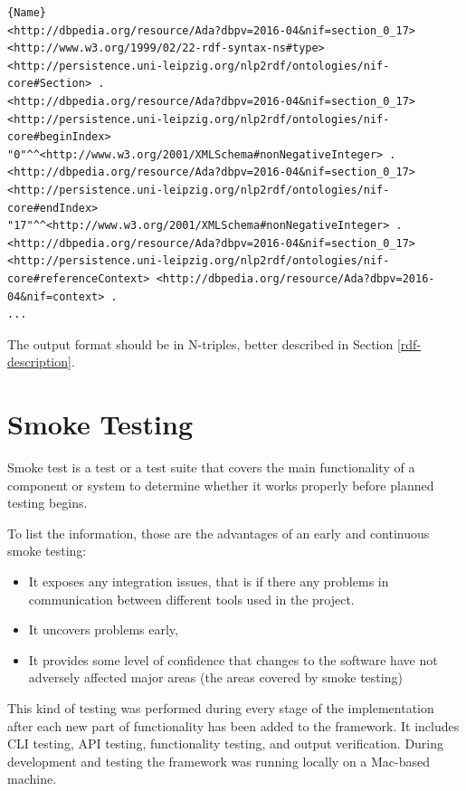 \documentclass[thesis=M,english,hidelinks]{FITthesis}[2019/12/23]
\begin{document}
\begin{lstlisting}[caption=Exemplary result for NIF Page Structure,frame=tlrb,  label = {lst:page-structure-example}]{Name}
<http://dbpedia.org/resource/Ada?dbpv=2016-04&nif=section_0_17> <http://www.w3.org/1999/02/22-rdf-syntax-ns#type> <http://persistence.uni-leipzig.org/nlp2rdf/ontologies/nif-core#Section> .
<http://dbpedia.org/resource/Ada?dbpv=2016-04&nif=section_0_17> <http://persistence.uni-leipzig.org/nlp2rdf/ontologies/nif-core#beginIndex> "0"^^<http://www.w3.org/2001/XMLSchema#nonNegativeInteger> .
<http://dbpedia.org/resource/Ada?dbpv=2016-04&nif=section_0_17> <http://persistence.uni-leipzig.org/nlp2rdf/ontologies/nif-core#endIndex> "17"^^<http://www.w3.org/2001/XMLSchema#nonNegativeInteger> .
<http://dbpedia.org/resource/Ada?dbpv=2016-04&nif=section_0_17> <http://persistence.uni-leipzig.org/nlp2rdf/ontologies/nif-core#referenceContext> <http://dbpedia.org/resource/Ada?dbpv=2016-04&nif=context> .
...
\end{lstlisting}

The output format should be in N-triples\cite{ntriples_format}, better described in Section \ref{rdf-description}.

\section{Smoke Testing}

Smoke test  is a test or a test suite that covers the main functionality of a component or system to determine whether it works properly before planned testing begins\cite{smoke_testing}.

To list the information, those are the advantages of an early and continuous smoke testing:
\begin{itemize}
	\item It exposes any integration issues, that is if there any problems in communication between different tools used in the project.
	\item It uncovers problems early, 
	\item It provides some level of confidence that changes to the software have not adversely affected major areas (the areas covered by smoke testing)
\end{itemize}

This kind of testing was performed during every stage of the implementation after each new part of functionality has been added to the framework. It includes \gls{CLI} testing, API testing, functionality testing, and output verification. During development and testing the framework was running locally on a Mac-based machine.
\end{document}
